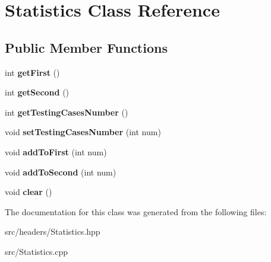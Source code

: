 \hypertarget{classStatistics}{\section{Statistics Class Reference}
\label{classStatistics}
}
\subsection*{Public Member Functions}
\begin{DoxyCompactItemize}
\item 
\hypertarget{classStatistics_aca73ba8ebcbdc237d2829a2fb377e21b}{int {\bfseries get\-First} ()}\label{classStatistics_aca73ba8ebcbdc237d2829a2fb377e21b}

\item 
\hypertarget{classStatistics_a5f8fe56aa20a6f420d26ab4f87629a03}{int {\bfseries get\-Second} ()}\label{classStatistics_a5f8fe56aa20a6f420d26ab4f87629a03}

\item 
\hypertarget{classStatistics_ac22edc61027bc702dbddc0287127de54}{int {\bfseries get\-Testing\-Cases\-Number} ()}\label{classStatistics_ac22edc61027bc702dbddc0287127de54}

\item 
\hypertarget{classStatistics_ace2a57535ff9c70d4b8f187c49f7290b}{void {\bfseries set\-Testing\-Cases\-Number} (int num)}\label{classStatistics_ace2a57535ff9c70d4b8f187c49f7290b}

\item 
\hypertarget{classStatistics_a0487edd5c45d29847a7f83ba43974ee7}{void {\bfseries add\-To\-First} (int num)}\label{classStatistics_a0487edd5c45d29847a7f83ba43974ee7}

\item 
\hypertarget{classStatistics_a74e32bb790dd6340d9213cc500878b44}{void {\bfseries add\-To\-Second} (int num)}\label{classStatistics_a74e32bb790dd6340d9213cc500878b44}

\item 
\hypertarget{classStatistics_a4faa80fa024777d57b6fa4b3559eec0a}{void {\bfseries clear} ()}\label{classStatistics_a4faa80fa024777d57b6fa4b3559eec0a}

\end{DoxyCompactItemize}


The documentation for this class was generated from the following files\-:\begin{DoxyCompactItemize}
\item 
src/headers/Statistics.\-hpp\item 
src/Statistics.\-cpp\end{DoxyCompactItemize}
